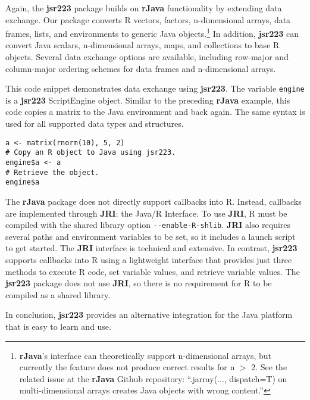 Again, the \textbf{jsr223} package builds on \textbf{rJava} functionality by extending data exchange. Our package converts R vectors, factors, n-dimensional arrays, data frames, lists, and environments to generic Java objects.\footnote{\textbf{rJava}'s interface can theoretically support n-dimensional arrays, but currently the feature does not produce correct results for n $>$ 2. See the related issue at the \textbf{rJava} Github repository: ``.jarray(..., dispatch=T) on multi-dimensional arrays creates Java objects with wrong content.''} In addition, \textbf{jsr223} can convert Java scalars, n-dimensional arrays, maps, and collections to base R objects. Several data exchange options are available, including row-major and column-major ordering schemes for data frames and n-dimensional arrays.

This code snippet demonstrates data exchange using \textbf{jsr223}. The variable \texttt{engine} is a \textbf{jsr223} ScriptEngine object. Similar to the preceding \textbf{rJava} example, this code copies a matrix to the Java environment and back again. The same syntax is used for all supported data types and structures.

\singlespace
\begin{verbatim}
a <- matrix(rnorm(10), 5, 2)
# Copy an R object to Java using jsr223.
engine$a <- a
# Retrieve the object.
engine$a
\end{verbatim}
\doublespace

The \textbf{rJava} package does not directly support callbacks into R. Instead, callbacks are implemented through \textbf{JRI}: the Java/R Interface. To use \textbf{JRI}, R must be compiled with the shared library option \texttt{-{}-enable-R-shlib}. \textbf{JRI} also requires several paths and environment variables to be set, so it includes a launch script to get started. The \textbf{JRI} interface is technical and extensive. In contrast, \textbf{jsr223} supports callbacks into R using a lightweight interface that provides just three methods to execute R code, set variable values, and retrieve variable values. The \textbf{jsr223} package does not use \textbf{JRI}, so there is no requirement for R to be compiled as a shared library.

In conclusion, \textbf{jsr223} provides an alternative integration for the Java platform that is easy to learn and use.

